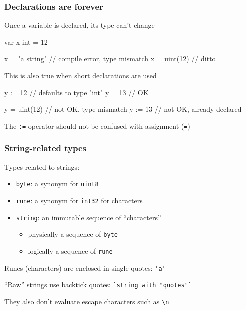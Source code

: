 \documentclass[handout,compress,t,11pt]{beamer}
\begin{document}
\begin{frame}[fragile]
    \frametitle{Declarations are forever}
    Once a variable is declared, its type can't change
\begin{golang}
var x int = 12

x = "a string"       // compile error, type mismatch
x = uint(12)         // ditto
\end{golang}
\vspace{0.5\baselineskip}
This is also true when short declarations are used
\begin{golang}
y := 12              // defaults to type "int"
y = 13               // OK

y = uint(12)         // not OK, type mismatch
y := 13              // not OK, already declared
\end{golang}
\vspace{0.5\baselineskip}
The \verb|:=| operator should not be confused with assignment (\verb|=|)
\end{frame}

\begin{frame}[fragile]
    \frametitle{String-related types}
    Types related to strings:
    \begin{itemize}
        \item \verb|byte|: a synonym for \verb|uint8| \\
        \vspace{0.5\baselineskip}

        \item \verb|rune|: a synonym for \verb|int32| for characters \\
        \vspace{0.5\baselineskip}

        \item \verb|string|: an immutable sequence of ``characters'' \\
        \begin{itemize}
        \item physically a sequence of \verb|byte|
        \item logically a sequence of \verb|rune|
        \end{itemize}
    \end{itemize}
    \vspace{\baselineskip}
    Runes (characters) are enclosed in single quotes: \verb|'a'| \par
    \vspace{\baselineskip}
    ``Raw'' strings use backtick quotes: \verb|`string with "quotes"`| \par
    \vspace{0.4\baselineskip}
    They also don't evaluate escape characters such as \verb|\n|
\end{frame}
\end{document}

